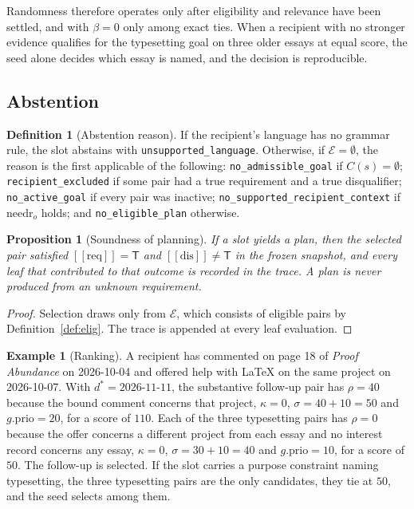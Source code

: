 \documentclass[11pt]{article}
\newtheorem{proposition}[theorem]{Proposition}
\theoremstyle{definition}
\newtheorem{definition}[theorem]{Definition}
\newtheorem{example}[theorem]{Example}
\theoremstyle{remark}
\newcommand{\vT}{\mathsf{T}}
\newcommand{\sem}[1]{[\![#1]\!]}
\newcommand{\code}[1]{\texttt{#1}}
\begin{document}
Randomness therefore operates only after eligibility and relevance have been settled, and with $\beta=0$ only among exact ties. When a recipient with no stronger evidence qualifies for the typesetting goal on three older essays at equal score, the seed alone decides which essay is named, and the decision is reproducible.

\subsection{Abstention}

\begin{definition}[Abstention reason]\label{def:abstain}
If the recipient's language has no grammar rule, the slot abstains with \code{unsupported\_language}. Otherwise, if $\mathcal{E}=\emptyset$, the reason is the first applicable of the following: \code{no\_admissible\_goal} if $C(s)=\emptyset$; \code{recipient\_excluded} if some pair had a true requirement and a true disqualifier; \code{no\_active\_goal} if every pair was inactive; \code{no\_supported\_recipient\_context} if $\mathrm{needr}_o$ holds; and \code{no\_eligible\_plan} otherwise.
\end{definition}

\begin{proposition}[Soundness of planning]\label{prop:plansound}
If a slot yields a plan, then the selected pair satisfied $\sem{\mathrm{req}}=\vT$ and $\sem{\mathrm{dis}}\neq\vT$ in the frozen snapshot, and every leaf that contributed to that outcome is recorded in the trace. A plan is never produced from an unknown requirement.
\end{proposition}
\begin{proof}
Selection draws only from $\mathcal{E}$, which consists of eligible pairs by Definition~\ref{def:elig}. The trace is appended at every leaf evaluation.
\end{proof}

\begin{example}[Ranking]\label{ex:rank}
A recipient has commented on page 18 of \emph{Proof Abundance} on 2026-10-04 and offered help with LaTeX on the same project on 2026-10-07. With $d^\ast=2026\text{-}11\text{-}11$, the substantive follow-up pair has $\rho=40$ because the bound comment concerns that project, $\kappa=0$, $\sigma=40+10=50$ and $g.\mathrm{prio}=20$, for a score of $110$. Each of the three typesetting pairs has $\rho=0$ because the offer concerns a different project from each essay and no interest record concerns any essay, $\kappa=0$, $\sigma=30+10=40$ and $g.\mathrm{prio}=10$, for a score of $50$. The follow-up is selected. If the slot carries a purpose constraint naming typesetting, the three typesetting pairs are the only candidates, they tie at $50$, and the seed selects among them.
\end{example}
\end{document}
